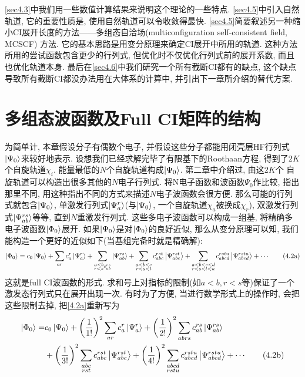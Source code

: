 \ref{sec4.3}中我们用一些数值计算结果来说明这个理论的一些特点. \ref{sec4.5}中引入自然轨道, 它的重要性质是, 使用自然轨道可以令收敛得最快. \ref{sec4.5}简要叙述另一种缩小CI展开长度的方法——多组态自洽场(multiconfiguration self-consistent field, MCSCF) 方法. 它的基本思路是用变分原理来确定CI展开中所用的轨道. 这种方法所用的尝试函数包含更少的行列式, 但优化时不仅优化行列式前的展开系数, 而且也优化轨道本身. 最后在\ref{sec4.6}中我们研究一个所有截断CI都有的缺点, 这个缺点导致所有截断CI都没办法用在大体系的计算中, 并引出下一章所介绍的替代方案.
\section{多组态波函数及Full CI矩阵的结构}
\label{sec4.1}
为简单计, 
本章假设分子有偶数个电子, 
并假设这些分子都能用闭壳层HF行列式$\Ket{\Psi_0}$来较好地表示. 
设想我们已经求解完毕了有限基下的Roothaan方程, 
得到了$2K$个自旋轨道${\chi_i}$. 
能量最低的$N$个自旋轨道构成$\Ket{\Psi_0}$. 
第二章中介绍过, 
由这$2K$个 自旋轨道可以构造出很多其他的$N$电子行列式. 
将N电子函数和\hft 波函数$\Psi_0$作比较, 
指出那里不同, 
用这种指出不同的方式来描述$N$电子波函数会很方便. 
那么可能的行列式就包含$\Ket{\Psi_0}$, 
单激发行列式$\Ket{\Psi_a^r}$(与$\Ket{\Psi_0}$, 
一个自旋轨道$\chi_a$被换成$\chi_r$), 
双激发行列式$\Ket{\Psi_{ab}^{rs}}$等等, 
直到$N$重激发行列式. 
这些多电子波函数可以构成一组基, 
将精确多电子波函数$\Ket{\Phi_0}$展开. 
如果$\Ket{\Psi_0}$是对$\Ket{\Phi_0}$的良好近似, 
那么从变分原理可以知, 
我们能构造一个更好的近似如下(当基组完备时就是精确解):
\begin{align}
\Ket{\Phi_0} = c_0\Ket{\Psi_0}+\sum_{ar}c_a^r\Ket{\Psi_{a}^r} + \sum_{\substack{a<b\\r<s}c_{ab}^{rs}}\Ket{\Psi_{ab}^{rs}} + \sum_{\substack{a<b<c\\r<s<t}}c_{abc}^{rst}\Ket{\Psi_{abc}^{rst}}+ \sum_{\substack{a<b<c<d\\r<s<t<u}}c_{abcd}^{rstu}\Ket{\Psi_{abcd}^{rstu}} + \cdots \tag{4.2a}
\label{4.2a}
\end{align}
这就是full CI波函数的形式. 
求和号上对指标的限制(如$a<b, r<s$等)保证了一个激发态行列式只在展开出现一次.
有时为了方便, 
当进行数学形式上的操作时, 
会把这些限制去掉, 
把\eqref{4.2a}重新写为
\begin{align}
\label{4.2}
\ket{\Phi_0} =& c_0\ket{\Psi_0}+ \left( \frac{1}{1!} \right)^2\sum_{ar}c_a^r\ket{\Psi_{a}^r} + \left( \frac{1}{2!} \right)^2\sum_{\substack{abrs}}c_{ab}^{rs}\ket{\Psi_{ab}^{rs}}\notag \\
&+\left( \frac{1}{3!} \right)^2 \sum_{\substack{abc\\rst}}c_{abc}^{rst}\ket{\Psi_{abc}^{rst}}+\left( \frac{1}{4!} \right)^2 \sum_{\substack{abcd\\rstu}}c_{abcd}^{rstu}\ket{\Psi_{abcd}^{rstu}} + \cdots \tag{4.2b}
\addtocounter{equation}{1}\end{align}
